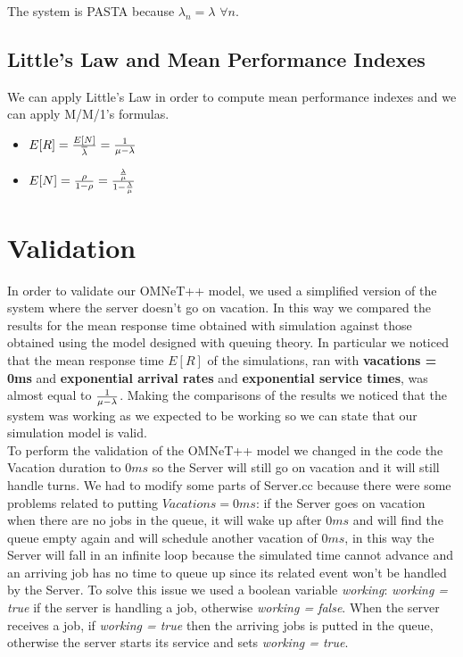 \documentclass{article}
\begin{document}
        The system is PASTA because $\lambda_n = \lambda$ $\forall n$.
    
    \subsection {Little's Law and Mean Performance Indexes}
    
        We can apply Little's Law in order to compute mean performance indexes and we can apply M/M/1's formulas.
        
        \begin{itemize}
        
            \item $E[R] = {E[N] \over \overline{\lambda}} = {1\over \mu -\lambda}$
            
            \item $E[N] = {\rho \over 1-\rho } = { {\lambda \over \mu} \over {1-{\lambda \over \mu}}}$
        \end{itemize}

\newpage 

\section{Validation}

    In order to validate our OMNeT++ model, we used a simplified version of the system where the server doesn't go on vacation. In this way we compared the results for the mean response time obtained with simulation against those obtained using the model designed with queuing theory. In particular we noticed that the mean response time $E[R]$ of the simulations, ran with \textbf{vacations = 0ms} and \textbf{exponential arrival rates} and \textbf{exponential service times}, was almost equal to ${1 \over \mu - \lambda}$.
    Making the comparisons of the results we noticed that the system was working as we expected to be working so we can state that our simulation model is valid.\\
    
    To perform the validation of the OMNeT++ model we changed in the code the Vacation duration to $0ms$ so the Server will still go on vacation and it will still handle turns. We had to modify some parts of Server.cc because there were some problems related to putting $Vacations=0ms$: if the Server goes on vacation when there are no jobs in the queue, it will wake up after $0ms$ and will find the queue empty again and will schedule another vacation of $0ms$, in this way the Server will fall in an infinite loop because the simulated time cannot advance and an arriving job has no time to queue up since its related event won't be handled by the Server. To solve this issue we used a boolean variable \textit{working}: \textit{working = true} if the server is handling a job, otherwise \textit{working = false}. When the server receives a job, if \textit{working = true} then the arriving jobs is putted in the queue, otherwise the server starts its service and sets \textit{working = true}. 
\end{document}
